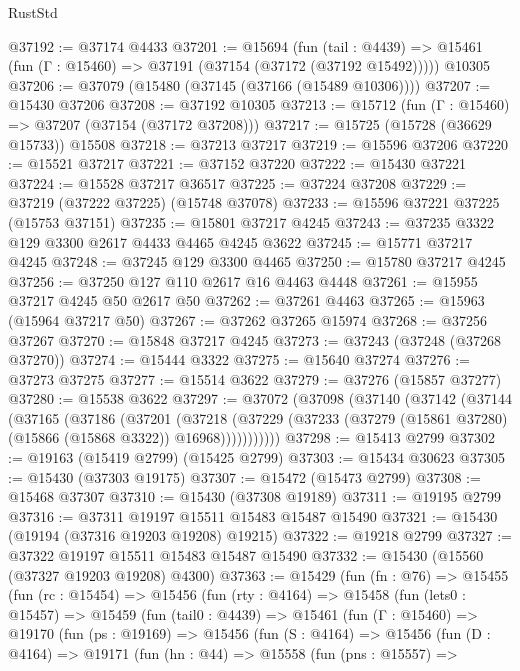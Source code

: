 \begin{lexlean}{RustStd}
\begin{coremodule}
@37192 := @37174 @4433
@37201 := @15694
    (fun (tail : @4439) => @15461 (fun (Γ : @15460) => @37191 (@37154 (@37172 (@37192 @15492)))))
    @10305
@37206 := @37079 (@15480 (@37145 (@37166 (@15489 @10306))))
@37207 := @15430 @37206
@37208 := @37192 @10305
@37213 := @15712 (fun (Γ : @15460) => @37207 (@37154 (@37172 @37208)))
@37217 := @15725 (@15728 (@36629 @15733)) @15508
@37218 := @37213 @37217
@37219 := @15596 @37206
@37220 := @15521 @37217
@37221 := @37152 @37220
@37222 := @15430 @37221
@37224 := @15528 @37217 @36517
@37225 := @37224 @37208
@37229 := @37219 (@37222 @37225) (@15748 @37078)
@37233 := @15596 @37221 @37225 (@15753 @37151)
@37235 := @15801 @37217 @4245
@37243 := @37235 @3322 @129 @3300 @2617 @4433 @4465 @4245 @3622
@37245 := @15771 @37217 @4245
@37248 := @37245 @129 @3300 @4465
@37250 := @15780 @37217 @4245
@37256 := @37250 @127 @110 @2617 @16 @4463 @4448
@37261 := @15955 @37217 @4245 @50 @2617 @50
@37262 := @37261 @4463
@37265 := @15963 (@15964 @37217 @50)
@37267 := @37262 @37265 @15974
@37268 := @37256 @37267
@37270 := @15848 @37217 @4245
@37273 := @37243 (@37248 (@37268 @37270))
@37274 := @15444 @3322
@37275 := @15640 @37274
@37276 := @37273 @37275
@37277 := @15514 @3622
@37279 := @37276 (@15857 @37277)
@37280 := @15538 @3622
@37297 := @37072
    (@37098
      (@37140
        (@37142
          (@37144
            (@37165
              (@37186
                (@37201
                  (@37218
                    (@37229
                      (@37233 (@37279 (@15861 @37280) (@15866 (@15868 @3322)) @16968)))))))))))
@37298 := @15413 @2799
@37302 := @19163 (@15419 @2799) (@15425 @2799)
@37303 := @15434 @30623
@37305 := @15430 (@37303 @19175)
@37307 := @15472 (@15473 @2799)
@37308 := @15468 @37307
@37310 := @15430 (@37308 @19189)
@37311 := @19195 @2799
@37316 := @37311 @19197 @15511 @15483 @15487 @15490
@37321 := @15430 (@19194 (@37316 @19203 @19208) @19215)
@37322 := @19218 @2799
@37327 := @37322 @19197 @15511 @15483 @15487 @15490
@37332 := @15430 (@15560 (@37327 @19203 @19208) @4300)
@37363 := @15429
    (fun (fn : @76) =>
    @15455
      (fun (rc : @15454) =>
      @15456
        (fun (rty : @4164) =>
        @15458
          (fun (lets0 : @15457) =>
          @15459
            (fun (tail0 : @4439) =>
            @15461
              (fun (Γ : @15460) =>
              @19170
                (fun (ps : @19169) =>
                @15456
                  (fun (S : @4164) =>
                  @15456
                    (fun (D : @4164) =>
                    @19171
                      (fun (hn : @44) =>
                      @15558
                        (fun (pns : @15557) =>

\end{coremodule}
\end{lexlean}
